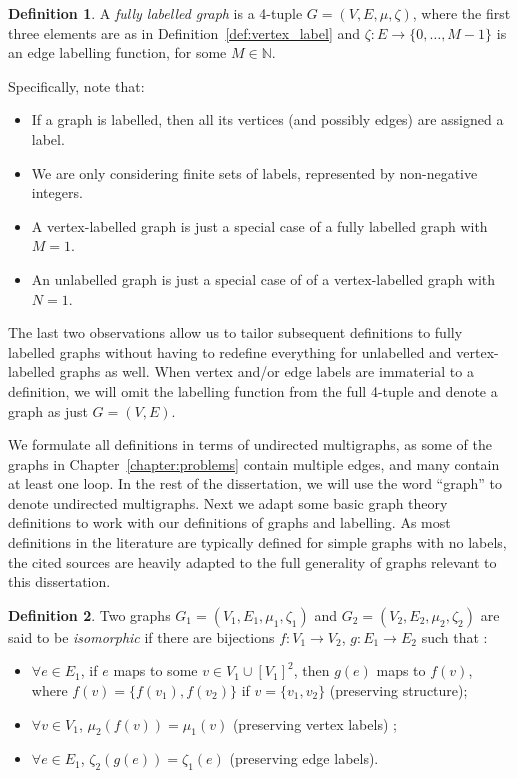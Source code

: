 \documentclass{l4proj}
\theoremstyle{definition}
\newtheorem{definition}{Definition}[chapter]
\theoremstyle{remark}
\begin{document}
\begin{definition} \label{def:edge_label}
  A \emph{fully labelled graph} is a 4-tuple $G = (V, E, \mu, \zeta)$, where the
  first three elements are as in Definition~\ref{def:vertex_label} and $\zeta
  \colon E \to \{ 0, \dots, M - 1 \}$ is an edge labelling function, for some $M
  \in \mathbb{N}$.
\end{definition}

Specifically, note that:

\begin{itemize}
\item If a graph is labelled, then all its vertices (and possibly edges) are
  assigned a label.
\item We are only considering finite sets of labels, represented by non-negative
  integers.
\item A vertex-labelled graph is just a special case of a fully labelled graph
  with $M = 1$.
\item An unlabelled graph is just a special case of of a vertex-labelled graph
  with $N = 1$.
\end{itemize}

The last two observations allow us to tailor subsequent definitions to fully
labelled graphs without having to redefine everything for unlabelled and
vertex-labelled graphs as well. When vertex and/or edge labels are immaterial to
a definition, we will omit the labelling function from the full 4-tuple and
denote a graph as just $G = (V, E)$.

We formulate all definitions in terms of undirected multigraphs, as some of the
graphs in Chapter~\ref{chapter:problems} contain multiple edges, and many contain
at least one loop. In the rest of the dissertation, we will use the word
``graph'' to denote undirected multigraphs. Next we adapt some basic graph
theory definitions to work with our definitions of graphs and labelling. As most
definitions in the literature are typically defined for simple graphs with no
labels, the cited sources are heavily adapted to the full generality of graphs
relevant to this dissertation.

\begin{definition}
  Two graphs $G_1 = (V_1, E_1, \mu_1, \zeta_1)$ and $G_2 = (V_2, E_2, \mu_2,
  \zeta_2)$ are said to be \emph{isomorphic} if there are bijections $f \colon
  V_1 \to V_2$, $g \colon E_1 \to E_2$ such that
  \cite{DBLP:journals/jcamd/RaymondW02a}:
  \begin{itemize}
  \item $\forall e \in E_1$, if $e$ maps to some $v \in V_1 \cup [V_1]^2$, then
    $g(e)$ maps to $f(v)$, where $f(v) = \{ f(v_1), f(v_2) \}$ if $v = \{ v_1,
    v_2 \}$ (preserving structure);
  \item $\forall v \in V_1$, $\mu_2(f(v)) = \mu_1(v)$ (preserving vertex labels)
    \cite{DBLP:journals/siamcomp/BabaiES80};
  \item $\forall e \in E_1$, $\zeta_2(g(e)) = \zeta_1(e)$ (preserving edge
    labels).
  \end{itemize}
\end{definition}
\end{document}
